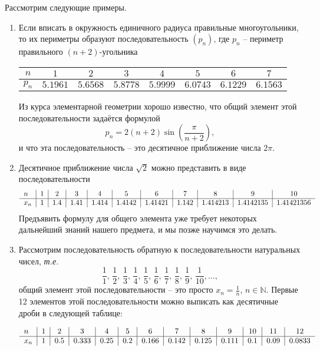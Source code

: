 \begin{example}
Рассмотрим следующие примеры.
    \begin{enumerate}
        \item Если вписать в окружность единичного радиуса правильные многоугольники, то их периметры образуют последовательность $(p_n)$, где $p_n$ -- периметр правильного $(n+2)$-угольника
        \begin{center}
            \begin{tabular}{c|c|c|c|c|c|c|c}
                $n$ & $1$ &  $2$ & $3$     & $4$  & $5$ & $6$ & $7$  \\ \hline
                $p_n$ & $5.1961$ & $5.6568$ & $5.8778$ & $5.9999$ & $6.0743$ & $6.1229$ & $6.1563$
            \end{tabular}
        \end{center}
        Из курса элементарной геометрии хорошо известно, что общий элемент этой последовательности задаётся формулой
        \[
         p_n = 2(n+2)\sin\left(\frac{\pi}{n+2}\right),
        \]
        и что эта последовательность -- это десятичное приближение числа $2\pi.$
     \item Десятичное приближение числа $\sqrt{2}$ можно представить в виде последовательности
    \[
    \begin{tabular}{l|c|c|c|c|c|c|c|c|c|c}
      $n$ & 1&2&3&4&5&6&7&8&9&10\\
       \hline
     $x_n$&  1 & 1.4 & 1.41 & 1.414 & 1.4142 & 1.41421 & 1.142& 1.414213 & 1.4142135 & 1.41421356  
         \end{tabular}
    \]
    Предъявить формулу для общего элемента уже требует некоторых дальнейший знаний нашего предмета, и мы позже научимся это делать.
    
    \item Рассмотрим последовательность обратную к последовательности натуральных чисел, \textit{т.е.}
    \[
      \frac{1}{1}, \,\frac{1}{2}, \,\frac{1}{3}, \, \frac{1}{4}, \, \frac{1}{5}, \, \frac{1}{6},\, \frac{1}{7},\, \frac{1}{8},\, \frac{1}{9},\, \frac{1}{10},  \ldots,
    \]
    общий элемент этой последовательности -- это просто $x_n = \frac{1}{n}$, $n \in \mathbb{N}.$ Первые 12 элементов этой последовательности можно выписать как десятичные дроби в следующей таблице:

        \[
         \begin{tabular}{l|c|c|c|c|c|c|c|c|c|c|c|c}
             $n$ & 1&2&3&4&5&6&7&8&9&10&11&12  \\
             \hline
             $x_n$&  1 & 0.5 & 0.333 & 0.25 & 0.2 & 0.166 & 0.142& 0.125 & 0.111 & 0.1 & 0.09 & 0.0833 
         \end{tabular}
        \]
        

\end{enumerate}
\end{example}
